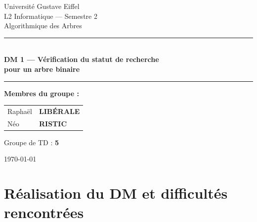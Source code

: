 \documentclass[12pt, a4paper]{article}
\begin{document}
\begin{titlepage}
    \centering
    \vspace*{1.5cm}

    {\large Université Gustave Eiffel\\[0.3em]
    L2 Informatique — Semestre 2\\[0.3em]
    Algorithmique des Arbres}

    \vspace{2cm}
    \rule{\linewidth}{0.8pt}\\[0.6em]
    {\LARGE\bfseries DM 1 — Vérification du statut \og{}de recherche\fg{}\\[0.4em]
    pour un arbre binaire}\\[0.4em]
    \rule{\linewidth}{0.8pt}

    \vspace{2cm}

    {\large\bfseries Membres du groupe :}\\[1em]
    \begin{tabular}{ll}
        Raphaël  & \textbf{LIBÉRALE} \\[0.4em]
        Néo & \textbf{RISTIC} \\
    \end{tabular}

    \vspace{2cm}

    {\large Groupe de TD : \textbf{5}}

    \vfill

    {\large\today}
\end{titlepage}

\tableofcontents
\newpage

\section{Réalisation du DM et difficultés rencontrées}
\end{document}
